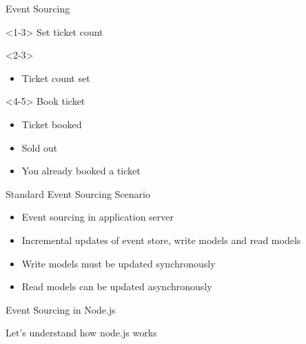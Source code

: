 \begin{frame}[fragile]{Event Sourcing}
\begin{minipage}{.7\textwidth}
\begin{onlyenv}
\end{onlyenv}
\end{minipage} \hfill
\begin{minipage}{0.25\textwidth}
\small
\begin{onlyenv}<1-3>
Set ticket count
\end{onlyenv}
\begin{onlyenv}<2-3>
\begin{itemize}
\item Ticket count set
\end{itemize}
\end{onlyenv}
\begin{onlyenv}<4-5>
Book ticket
\begin{itemize}
\item Ticket booked
\item Sold out
\item You already booked a ticket
\end{itemize}
\end{onlyenv}
\end{minipage}

\end{frame}

\begin{frame}[fragile]{Standard Event Sourcing Scenario}

\begin{itemize}
\item Event sourcing in application server
\item Incremental updates of event store, write models and read models
\item Write models must be updated synchronously
\item Read models can be updated asynchronously
\end{itemize}

\end{frame}

\begin{frame}[fragile]{Event Sourcing in Node.js}

Let's understand how node.js works

\end{frame}

